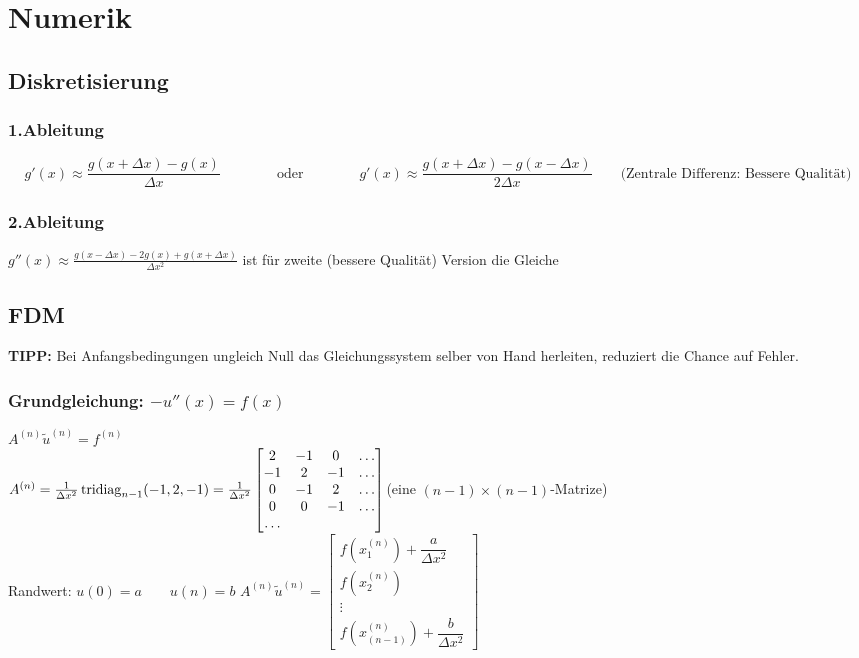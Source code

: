 
\section{Numerik}
\subsection{Diskretisierung}
\subsubsection{1.Ableitung}

$$g'(x)\approx \frac{g(x+\Delta x)-g(x)}{\Delta x} \qquad\qquad \text{oder}
\qquad\qquad \boxed{g'(x)\approx \frac{g(x+\Delta x)-g(x-\Delta x)}{2\Delta
x}}\qquad \text{(Zentrale Differenz: Bessere Qualität)}$$
\subsubsection{2.Ableitung}
$\boxed{g''(x)\approx \frac{g(x-\Delta x)-2 g(x) + g(x+ \Delta x)}{\Delta x^2}}$ ist für zweite (bessere Qualität) Version die Gleiche

\subsection{FDM}
\textbf{TIPP:} Bei Anfangsbedingungen ungleich Null das Gleichungssystem selber von Hand herleiten, reduziert die Chance auf Fehler.
\subsubsection{Grundgleichung: $-u''(x)=f(x)$}
$ A^{(n)} \tilde{u}^{(n)} =f^{(n)}   $\\
$A^{(n)}= \frac{1}{\Delta x^2} \operatorname{tridiag}_{n-1} (-1,2,-1) = \frac{1}{\Delta x^2}
  \begin{bmatrix}
             2& -1 & 0 & \ldots \\
             -1& 2 & -1 & \ldots \\
              0& -1 & 2 & \ldots \\
              0& 0 & -1 & \ldots \\
             \ldots
           \end{bmatrix}$\qquad (eine $(n-1)\times(n-1)$-Matrize)\\
Randwert: $u(0)= a \qquad u(n)=b $ \qquad
$A^{(n)}\tilde{u}^{(n)} =\begin{bmatrix}
             f(x_1^{(n)}) + \dfrac{a}{\Delta x^2} \\
             f(x_2^{(n)}) \\
             \vdots  \\
             f(x_{(n-1)}^{(n)}) + \dfrac{b}{\Delta x^2}
           \end{bmatrix} $\\
